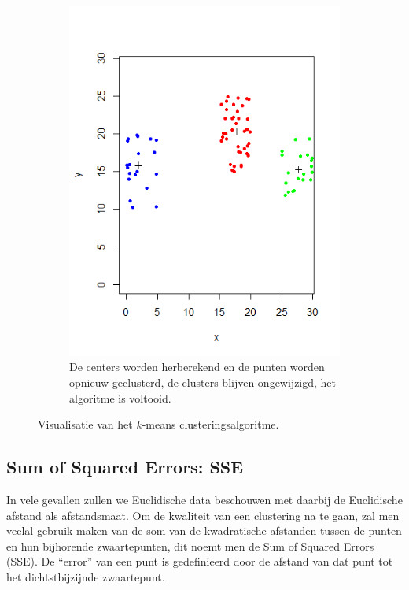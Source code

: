 \documentclass[a4paper,12pt]{article}
\theoremstyle{definition}
\begin{document}
\begin{figure}[!ht]
\begin{subfigure}[t]{0.3\textwidth}
        \includegraphics[width=\textwidth]{kmeans_it4.png}
        \caption{De centers worden herberekend en de punten worden opnieuw geclusterd,
        de clusters blijven ongewijzigd, het algoritme is voltooid.}
    \end{subfigure}
    \caption{Visualisatie van het $k$-means clusteringsalgoritme.}\label{fig:kmeans}
\end{figure}


\subsection{Sum of Squared Errors: SSE}
\label{SSE}
In vele gevallen zullen we Euclidische data beschouwen met daarbij de Euclidische
afstand als afstandsmaat. Om de kwaliteit van een clustering na te gaan, zal men
veelal gebruik maken van de som van de kwadratische afstanden tussen de punten
en hun bijhorende zwaartepunten, dit noemt men de Sum of Squared Errors (SSE).
De ``error'' van een punt is gedefinieerd door de afstand van dat punt tot het
dichtstbijzijnde zwaartepunt.
\end{document}
